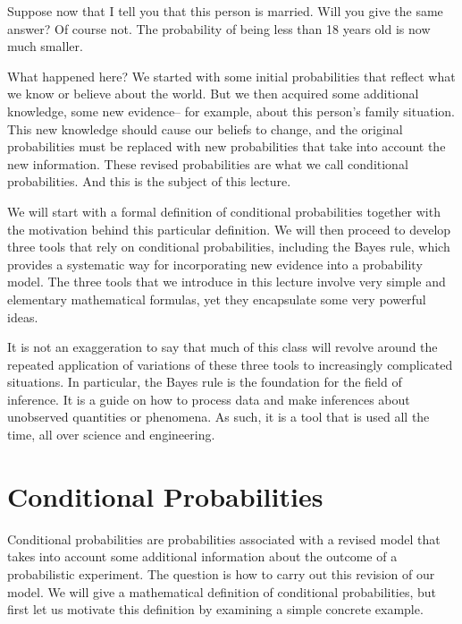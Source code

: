\documentclass{tufte-handout}
\begin{document}
Suppose now that I tell you that this person is married. Will you give the same answer? Of course not. The probability of being less than 18 years old is now much smaller.

What happened here? We started with some initial probabilities that reflect what we know or believe about the world. But we then acquired some additional knowledge, some new evidence-- for example, about this person's family situation.
This new knowledge should cause our beliefs to change, and the original probabilities must be replaced with new probabilities that take into account the new information. These revised probabilities are what we call conditional probabilities. And this is the subject of this lecture.

We will start with a formal definition of conditional probabilities together with the motivation behind this particular definition. We will then proceed to develop three tools that rely on conditional probabilities, including the Bayes rule, which provides a systematic way for incorporating new evidence into a probability model. The three tools that we introduce in this lecture involve very simple and elementary mathematical formulas, yet they encapsulate some very powerful ideas.

It is not an exaggeration to say that much of this class will revolve around the repeated application of variations of these three tools to increasingly complicated situations. In particular, the Bayes rule is the foundation for the field of inference. It is a guide on how to process data and make inferences about unobserved quantities or phenomena. As such, it is a tool that is used all the time, all over science and engineering.

\pagebreak
\section{Conditional Probabilities}\label{sec:CondProbs}

Conditional probabilities are probabilities associated with a revised model that takes into account some
additional information about the outcome of a probabilistic experiment. The question is how to carry out
this revision of our model. We will give a mathematical definition of conditional probabilities, but first let
us motivate this definition by examining a simple concrete example. 
\end{document}
